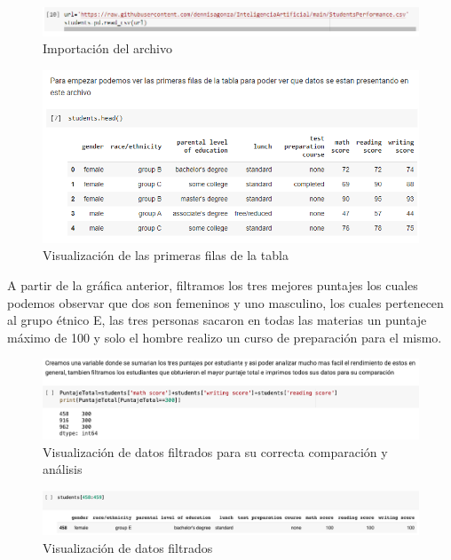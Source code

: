 \documentclass[conference,compsoc,onecolumn]{IEEEtran}
\begin{document}
    \begin{figure}[H]
            \includegraphics[scale=0.80]{datos.png}
            \caption{Importación del archivo}
            \label{subfigura2}
            \vspace{0,5cm}
    \end{figure}
    \begin{figure}[H]       
            \centering
            \includegraphics[scale = 0.80]{head.png}
            \caption{Visualización de las primeras filas de la tabla}
            \label{subfigura3}
             \vspace{0,5cm}
       
    \end{figure}
    
    A partir de la gráfica anterior, filtramos los tres mejores puntajes los cuales podemos observar que dos son femeninos y uno masculino, los cuales pertenecen al grupo étnico E, las tres personas sacaron en todas las materias un puntaje máximo de 100 y solo el hombre realizo un curso de preparación para el mismo.
    
    \begin{figure}[H]
            \includegraphics[scale = 0.50]{1.png}
            \caption{Visualización de datos filtrados para su correcta comparación y análisis}
            \label{subfigura4}
             \vspace{0,5cm}
       
    \end{figure} 
    \begin{figure}[H]
            \includegraphics[scale = 0.50]{2.png}
            \caption{Visualización de datos filtrados}
            \label{subfigura18}
             \vspace{0,5cm}
    \end{figure} 
        
\end{document}
